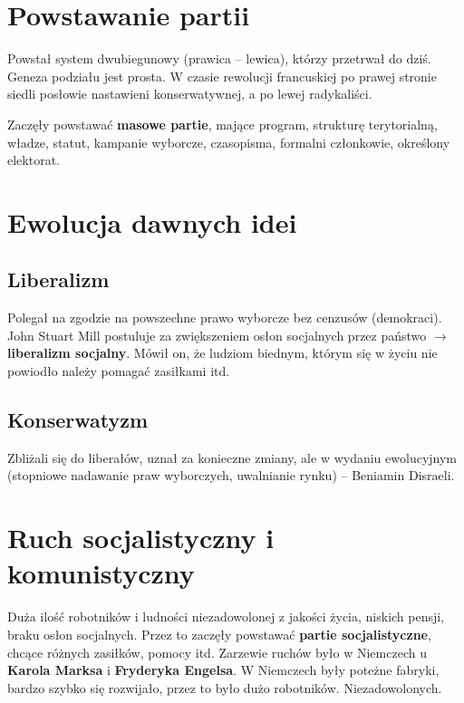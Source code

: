 \documentclass [a4paper, 11pt, oneside]{book}
\begin{document}
    \section{Powstawanie partii} %
    \label{sec:powstawanie_partii}
        Powstał system dwubiegunowy (prawica -- lewica), którzy przetrwał do dziś. Geneza podziału jest prosta. W czasie rewolucji francuskiej po prawej stronie siedli posłowie nastawieni konserwatywnej, a po lewej radykaliści.

        Zaczęły powstawać \textbf{masowe partie}, mające program, strukturę terytorialną, władze, statut, kampanie wyborcze, czasopisma, formalni członkowie, określony elektorat.
    \section{Ewolucja dawnych idei} %
    \label{sec:ewolucja_dawnych_idei}
        \subsection{Liberalizm} %
        \label{sub:liberalizm}
            Polegał na zgodzie na powszechne prawo wyborcze bez cenzusów (demokraci). John Stuart Mill postuluje za zwiększeniem osłon socjalnych przez państwo $\rightarrow$ \textbf{liberalizm socjalny}. Mówił on, że ludziom biednym, którym się w życiu nie powiodło należy pomagać zasiłkami itd.
        \subsection{Konserwatyzm} %
        \label{sub:konserwatyzm}
            Zbliżali się do liberałów, uznał za konieczne zmiany, ale w wydaniu ewolucyjnym (stopniowe nadawanie praw wyborczych, uwalnianie rynku) -- Beniamin Disraeli.
    \section{Ruch socjalistyczny i komunistyczny} %
    \label{sec:ruch_socjalistyczny_i_komunistyczny}
        Duża ilość robotników i ludności niezadowolonej z jakości życia, niskich pensji, braku osłon socjalnych. Przez to zaczęły powstawać \textbf{partie socjalistyczne}, chcące różnych zasiłków, pomocy itd. Zarzewie ruchów było w Niemczech u \textbf{Karola Marksa} i \textbf{Fryderyka Engelsa}. W Niemczech były poteżne fabryki, bardzo szybko się rozwijało, przez to było dużo robotników. Niezadowolonych.
\end{document}
